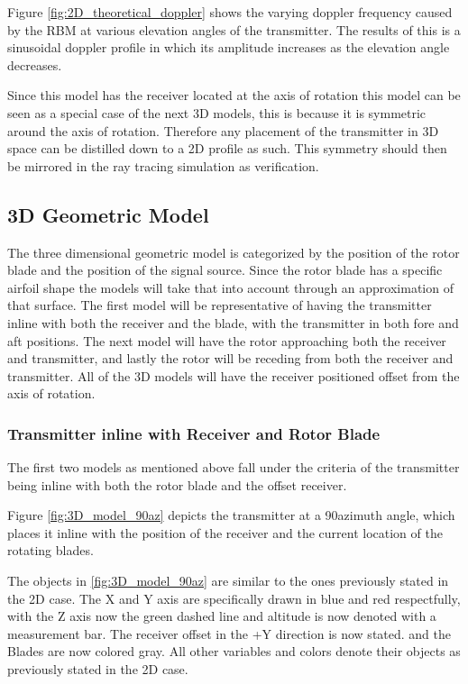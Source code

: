 Figure \ref{fig:2D_theoretical_doppler} shows the varying doppler frequency caused by the RBM at various elevation angles of the transmitter. The results of this is a sinusoidal doppler profile in which its amplitude increases as the elevation angle decreases. 

Since this model has the receiver located at the axis of rotation this model can be seen as a special case of the next 3D models, this is because it is symmetric around the axis of rotation. Therefore any placement of the transmitter in 3D space can be distilled down to a 2D profile as such. This symmetry should then be mirrored in the ray tracing simulation as verification.

\subsection{3D Geometric Model}
The three dimensional geometric model is categorized by the position of the rotor blade and the position of the signal source. Since the rotor blade has a specific airfoil shape the models will take that into account through an approximation of that surface. The first model will be representative of having the transmitter inline with both the receiver and the blade, with the transmitter in both fore and aft positions. The next model will have the rotor approaching both the receiver and transmitter, and lastly the rotor will be receding from both the receiver and transmitter. All of the 3D models will have the receiver positioned offset from the axis of rotation.

\subsubsection{Transmitter inline with Receiver and Rotor Blade}
The first two models as mentioned above fall under the criteria of the transmitter being inline with both the rotor blade and the offset receiver. 

Figure \ref{fig:3D_model_90az} depicts the transmitter at a 90\textdegree \space azimuth angle, which places it inline with the position of the receiver and the current location of the rotating blades. 

The objects in \ref{fig:3D_model_90az}  are similar to the ones previously stated in the 2D case. The X and Y axis are specifically drawn in blue and red respectfully, with the Z axis now the green dashed line and altitude is now denoted with a measurement bar. The receiver offset in the +Y direction is now stated. and the Blades are now colored gray. All other variables and colors denote their objects as previously stated in the 2D case. 

